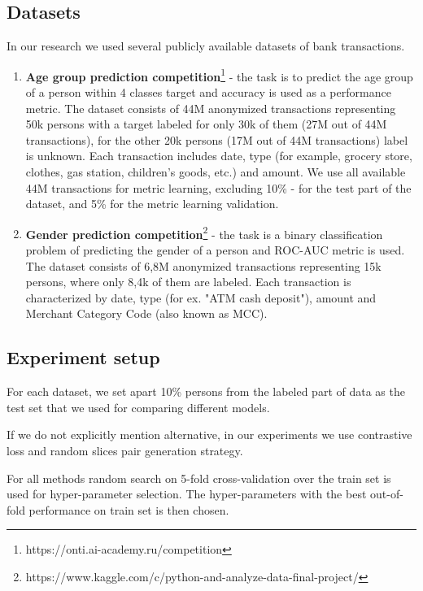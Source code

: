 \documentclass{article}
\begin{document}
\subsection{Datasets} \label{sec-datasets}
In our research we used several publicly available datasets of bank transactions.
\begin{enumerate}
    \item \textbf{Age group prediction competition}\footnote{https://onti.ai-academy.ru/competition} - the task is to predict the age group of a person within 4 classes target and accuracy is used as a performance metric.
    The dataset consists of 44M anonymized transactions representing 50k persons with a target labeled for only 30k of them (27M out of 44M transactions), for the other 20k persons (17M out of 44M transactions) label is unknown. Each transaction includes date, type (for example, grocery store, clothes, gas station, children's goods, etc.) and amount. We use all available 44M transactions for metric learning, excluding 10\% - for the test part of the dataset, and  5\% for the metric learning validation.
        
    \item \textbf{Gender prediction competition}\footnote{https://www.kaggle.com/c/python-and-analyze-data-final-project/} - the task is a binary classification problem of predicting the gender of a person and ROC-AUC metric is used.
    The dataset consists of 6,8M anonymized transactions representing 15k persons, where only 8,4k of them are labeled. Each transaction is characterized by date, type (for ex. "ATM cash deposit"), amount and Merchant Category Code (also known as MCC).
\end{enumerate}

\subsection{Experiment setup}

For each dataset, we set apart 10\% persons from the labeled part of data as the test set that we used for comparing different models.

If we do not explicitly mention alternative, in our experiments we use contrastive loss and random slices pair generation strategy.

For all methods random search on 5-fold cross-validation over the train set is used for hyper-parameter selection. The hyper-parameters with the best out-of-fold performance on train set is then chosen.
\end{document}

